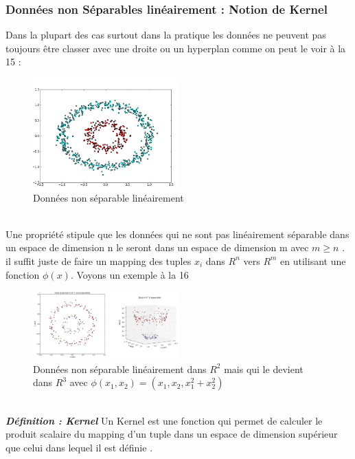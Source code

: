 \subsubsection{Données non Séparables linéairement : Notion de Kernel  \cite{SVm2}}
Dans la plupart des cas surtout dans la pratique les données ne peuvent pas toujours être classer avec une droite ou un hyperplan comme on peut le voir à la \figurename{15} :
 \begin{figure}[ht]
 	\centering
 	\includegraphics[width=0.5\textwidth]{fig/NonLinearDecisionBoudary.png}
 	\caption[Short caption]{Données non séparable linéairement  }
 	\label{fig:image15}
 \end{figure}\\
 Une propriété stipule que les données qui ne sont pas linéairement séparable dans un espace de dimension n le seront dans un espace de dimension m avec $m \ge n$ \cite{8}. il suffit juste de faire un mapping des tuples ${x}_{i}$  dans ${R}^{n}$ vers ${R}^{m}$ en utilisant une fonction $\phi(x)$. Voyons un exemple à la \figurename{16}\\
  \begin{figure}[ht]
  	\centering
  	\includegraphics[width=0.5\textwidth]{fig/NonLinearDecisionBoudary2.png}
  	\caption[Short caption]{Données non séparable linéairement dans ${R}^{2}$ mais qui le devient dans ${R}^{3}$ avec $\phi({x}_{1},{x}_{2} ) = ({x}_{1},{x}_{2},{x}^{2}_{1}+{x}^{2}_{2})$ }
  	\label{fig:image16}
  \end{figure}\\
 \emph{\textbf{Définition  : Kernel}}
 Un Kernel est une fonction qui permet de calculer le produit scalaire du mapping d'un tuple dans un espace de dimension supérieur que celui dans lequel il est définie .

